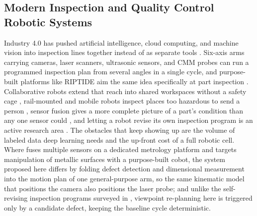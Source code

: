 \documentclass[conference]{IEEEtran}
\begin{document}
\subsection{Modern Inspection and Quality Control Robotic Systems}
Industry 4.0 has pushed artificial intelligence, cloud computing, and machine vision into inspection lines together instead of as separate tools \cite{ref7}\cite{ref8}\cite{ref10}. Six-axis arms carrying cameras, laser scanners, ultrasonic sensors, and CMM probes can run a programmed inspection plan from several angles in a single cycle, and purpose-built platforms like RIPTIDE aim the same idea specifically at part inspection \cite{ref9}. Collaborative robots extend that reach into shared workspaces without a safety cage \cite{ref13}, rail-mounted and mobile robots inspect places too hazardous to send a person \cite{ref11}, sensor fusion gives a more complete picture of a part's condition than any one sensor could \cite{ref12}, and letting a robot revise its own inspection program is an active research area \cite{ref14}. The obstacles that keep showing up are the volume of labeled data deep learning needs and the up-front cost of a full robotic cell. Where \cite{ref12} fuses multiple sensors on a dedicated metrology platform and \cite{ref13} targets manipulation of metallic surfaces with a purpose-built cobot, the system proposed here differs by folding defect detection and dimensional measurement into the motion plan of one general-purpose arm, so the same kinematic model that positions the camera also positions the laser probe; and unlike the self-revising inspection programs surveyed in \cite{ref14}, viewpoint re-planning here is triggered only by a candidate defect, keeping the baseline cycle deterministic.
\end{document}

